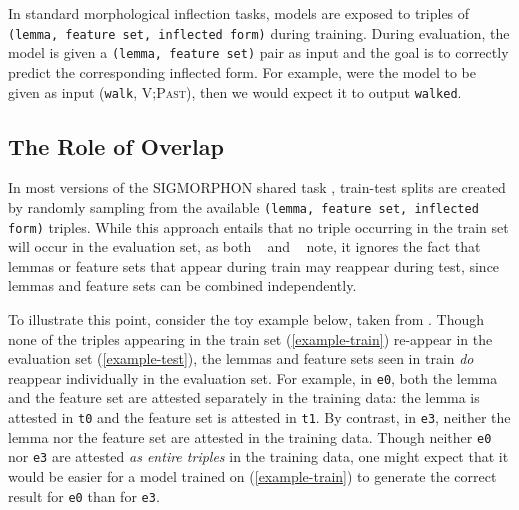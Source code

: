 \documentclass[11pt]{article}
\newcommand{\goldmant}{\citet{goldman-etal-2022-un}}
\newcommand{\kodnert}{\citet{kodner-etal-2022-sigmorphon}}
\begin{document}
In standard morphological inflection tasks, models are exposed to triples of \texttt{(lemma, feature set, inflected form)} during training.
During evaluation, the model is given a \texttt{(lemma, feature set)} pair as input and the goal is to correctly predict the corresponding inflected form.
For example,  were the model to be given as input (\texttt{walk}, \textsc{V;Past}), then we would expect it to output \texttt{walked}. 

\subsection{The Role of Overlap}
In most versions of the SIGMORPHON shared task \citep{cotterell-etal-2016-sigmorphon, cotterell-etal-2017-conll, cotterell-etal-2018-conll, mccarthy-etal-2019-sigmorphon, vylomova-etal-2020-sigmorphon, pimentel-ryskina-etal-2021-sigmorphon, goldman-etal-2023-sigmorphon}, train-test splits are created by randomly sampling from the available \texttt{(lemma, feature set, inflected form)} triples. 
While this approach entails that no triple occurring in the train set will occur in the evaluation set, as  both \goldmant~ and \kodnert~ note, it ignores the fact that lemmas or feature sets that appear during train may reappear during test, since lemmas and feature sets can be combined independently. 

To illustrate this point, consider the toy example below, taken from \citet{kodner-etal-2023-morphological}. 
Though none of the triples appearing in the train set (\ref{example-train}) re-appear in the evaluation set (\ref{example-test}), the lemmas and feature sets seen in train \textit{do} reappear individually in the evaluation set. 
For example, in \texttt{e0}, both the lemma and the feature set are attested separately in the training data: the lemma is attested in \texttt{t0} and the feature set is attested in \texttt{t1}. 
By contrast, in \texttt{e3}, neither the lemma nor the feature set are attested in the training data. 
Though neither \texttt{e0} nor \texttt{e3} are attested \textit{as entire triples} in the training data, one might expect that it would be easier for a model trained on (\ref{example-train}) to generate the correct result for \texttt{e0} than for \texttt{e3}. 
\end{document}
